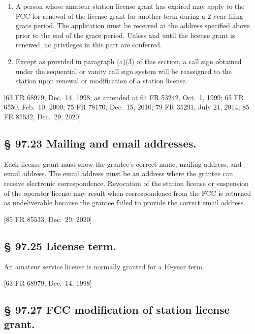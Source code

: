 \documentclass[
  letterpaper,
  DIV=11,
  numbers=noendperiod]{scrreport}
\begin{document}
\begin{enumerate}
\def\labelenumi{(\alph{enumi})}
\setcounter{enumi}{1}
\item
  A person whose amateur station license grant has expired may apply to
  the FCC for renewal of the license grant for another term during a 2
  year filing grace period. The application must be received at the
  address specified above prior to the end of the grace period. Unless
  and until the license grant is renewed, no privileges in this part are
  conferred.
\item
  Except as provided in paragraph (a)(3) of this section, a call sign
  obtained under the sequential or vanity call sign system will be
  reassigned to the station upon renewal or modification of a station
  license.
\end{enumerate}

{[}63 FR 68979, Dec.~14, 1998, as amended at 64 FR 53242, Oct.~1, 1999;
65 FR 6550, Feb.~10, 2000; 75 FR 78170, Dec.~15, 2010; 79 FR 35291, July
21, 2014; 85 FR 85532, Dec.~29, 2020{]}

\hypertarget{97.23}{%
\subsection*{§ 97.23 Mailing and email addresses.}\label{97.23}}

Each license grant must show the grantee's correct name, mailing
address, and email address. The email address must be an address where
the grantee can receive electronic correspondence. Revocation of the
station license or suspension of the operator license may result when
correspondence from the FCC is returned as undeliverable because the
grantee failed to provide the correct email address.

{[}85 FR 85533, Dec.~29, 2020{]}

\hypertarget{97.25}{%
\subsection*{§ 97.25 License term.}\label{97.25}}

An amateur service license is normally granted for a 10-year term.

{[}63 FR 68979, Dec.~14, 1998{]}

\hypertarget{fcc-modification-of-station-license-grant.}{%
\subsection{§ 97.27 FCC modification of station license
grant.}\label{fcc-modification-of-station-license-grant.}}
\end{document}
